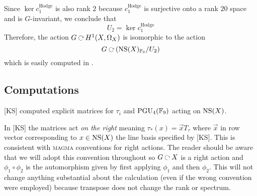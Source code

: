 \documentclass[12pt]{article}
\begin{document}
Since $\ker{c_1^{\text{Hodge}}}$ is also rank $2$ because $c_1^{\text{Hodge}}$ is surjective onto a rank $20$ space and is $G$-invariant, we conclude that
\[ U_2 = \ker{c_1^{\text{Hodge}}} \]
Therefore, the action $G \acts H^1(X, \Omega_X)$ is isomorphic to the action
\[ G \acts (\NS(X)_{\FF_9} / U_2) \]
which is easily computed in \magma.

\subsection{Computations}

[KS] computed explicit matrices for $\tau_i$ and $\mathrm{PGU}_4(\mathbb{F}_9)$ acting on $\operatorname{\mathrm{NS}}(X)$.

\begin{rmk}
In [KS] the matrices act \textit{on the right} meaning $\tau_*(x) = \vec{x} T_{\tau}$ where $\vec{x}$ in row vector corresponding to $x \in \operatorname{\mathrm{NS}}(X)$ the line basis specified by [KS]. This is consistent with \textsc{magma} conventions for right actions. The reader should be aware that we will adopt this convention throughout so $G \acts X$ is a right action and $\phi_1 \circ \phi_2$ is the automorphism given by first applying $\phi_1$ and then $\phi_2$. This will not change anything substantial about the calculation (even if the wrong convention were employed) because transpose does not change the rank or spectrum.
\end{rmk}
\end{document}
